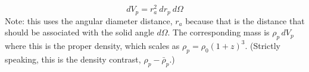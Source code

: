 \begin{equation}
  dV_p = r_a^2\ dr_p\ d\Omega
\end{equation}
Note: this uses the angular diameter distance, $r_a$ because that is the distance that should be associated with the solid angle $d\Omega$.  The corresponding mass is $\rho_p\,dV_p$ where this is the proper density, which scales as $\rho_p = \rho_0 (1+z)^3$.  (Strictly speaking, this is the density contrast, $\rho_p - \bar\rho_p$.)